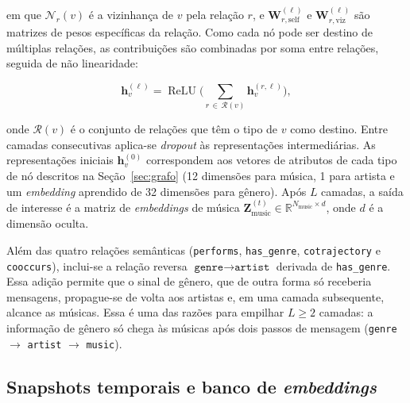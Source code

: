 \noindent em que $\mathcal{N}_r(v)$ é a vizinhança de $v$ pela relação $r$, e $\mathbf{W}^{(\ell)}_{r,\text{self}}$ e $\mathbf{W}^{(\ell)}_{r,\text{viz}}$ são matrizes de pesos específicas da relação. Como cada nó pode ser destino de múltiplas relações, as contribuições são combinadas por soma entre relações, seguida de não linearidade:

\begin{equation}
\label{eq:hetero-agg}
\mathbf{h}_v^{(\ell)} = \operatorname{ReLU}\!\Bigg( \sum_{r \,\in\, \mathcal{R}(v)} \mathbf{h}_v^{(r,\ell)} \Bigg),
\end{equation}

\noindent onde $\mathcal{R}(v)$ é o conjunto de relações que têm o tipo de $v$ como destino. Entre camadas consecutivas aplica-se \emph{dropout} às representações intermediárias. As representações iniciais $\mathbf{h}_v^{(0)}$ correspondem aos vetores de atributos de cada tipo de nó descritos na Seção~\ref{sec:grafo} (12 dimensões para música, 1 para artista e um \emph{embedding} aprendido de 32 dimensões para gênero). Após $L$ camadas, a saída de interesse é a matriz de \emph{embeddings} de música $\mathbf{Z}^{(t)}_{\text{music}} \in \mathbb{R}^{N_{\text{music}} \times d}$, onde $d$ é a dimensão oculta.

Além das quatro relações semânticas (\texttt{performs}, \texttt{has\_genre}, \texttt{cotrajectory} e \texttt{cooccurs}), inclui-se a relação reversa $\texttt{genre} \to \texttt{artist}$ derivada de \texttt{has\_genre}. Essa adição permite que o sinal de gênero, que de outra forma só receberia mensagens, propague-se de volta aos artistas e, em uma camada subsequente, alcance as músicas. Essa é uma das razões para empilhar $L \geq 2$ camadas: a informação de gênero só chega às músicas após dois passos de mensagem (\texttt{genre} $\to$ \texttt{artist} $\to$ \texttt{music}).

\subsection{Snapshots temporais e banco de \emph{embeddings}}

